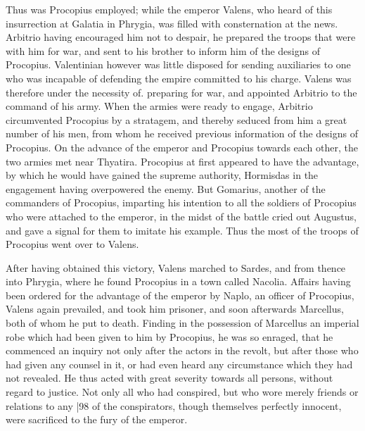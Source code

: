 Thus was Procopius employed; while the emperor Valens, who heard of this insurrection at Galatia in Phrygia, was filled with consternation at the news. Arbitrio having encouraged him not to despair, he prepared the troops that were with him for war, and sent to his brother to inform him of the designs of Procopius. Valentinian however was little disposed for sending auxiliaries to one who was incapable of defending the empire committed to his charge. Valens was therefore under the necessity of. preparing for war, and appointed Arbitrio to the command of his army. When the armies were ready to engage, Arbitrio circumvented Procopius by a stratagem, and thereby seduced from him a great number of his men, from whom he received previous information of the designs of Procopius. On the advance of the emperor and Procopius towards each other, the two armies met near Thyatira. Procopius at first appeared to have the advantage, by which he would have gained the supreme authority, Hormisdas in the engagement having overpowered the enemy. But Gomarius, another of the commanders of Procopius, imparting his intention to all the soldiers of Procopius who were attached to the emperor, in the midst of the battle cried out Augustus, and gave a signal for them to imitate his example. Thus the most of the troops of Procopius went over to Valens.

After having obtained this victory, Valens marched to Sardes, and from thence into Phrygia, where he found Procopius in a town called Nacolia. Affairs having been ordered for the advantage of the emperor by Naplo, an officer of Procopius, Valens again prevailed, and took him prisoner, and soon afterwards Marcellus, both of whom he put to death. Finding in the possession of Marcellus an imperial robe which had been given to him by Procopius, he was so enraged, that he commenced an inquiry not only after the actors in the revolt, but after those who had given any counsel in it, or had even heard any circumstance which they had not revealed. He thus acted with great severity towards all persons, without regard to justice. Not only all who had conspired,
but who wore merely friends or relations to any |98
of the conspirators, though themselves perfectly innocent, were sacrificed to the fury of the emperor.

